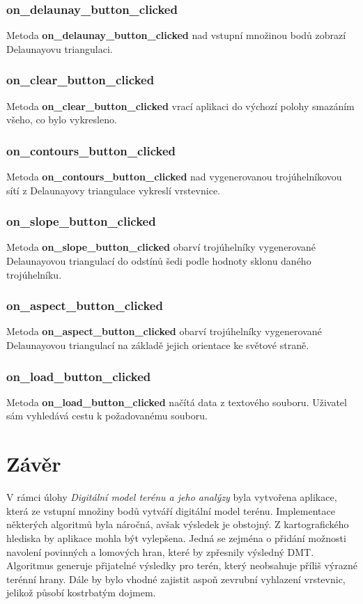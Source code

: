 \documentclass[a4paper, 12pt]{article}
\begin{document}
\subsubsection*{on\_delaunay\_button\_clicked}
Metoda \textbf{on\_delaunay\_button\_clicked} nad vstupní množinou bodů zobrazí Delaunayovu triangulaci. 

\subsubsection*{on\_clear\_button\_clicked}
Metoda \textbf{on\_clear\_button\_clicked} vrací aplikaci do výchozí polohy smazáním všeho, co bylo vykresleno. 

\subsubsection*{on\_contours\_button\_clicked}
Metoda \textbf{on\_contours\_button\_clicked} nad vygenerovanou trojúhelníkovou sítí z Delaunayovy triangulace vykreslí vrstevnice. 

\subsubsection*{on\_slope\_button\_clicked}
Metoda \textbf{on\_slope\_button\_clicked} obarví trojúhelníky vygenerované Delaunayovou triangulací do odstínů šedi podle hodnoty sklonu daného trojúhelníku.

\subsubsection*{on\_aspect\_button\_clicked}
Metoda \textbf{on\_aspect\_button\_clicked} obarví trojúhelníky vygenerované Delaunayovou triangulací na základě jejich orientace ke světové straně.

\subsubsection*{on\_load\_button\_clicked}
Metoda \textbf{on\_load\_button\_clicked} načítá data z textového souboru. Uživatel sám vyhledává cestu k požadovanému souboru.

\clearpage
\section{Závěr}
V rámci úlohy \textit{Digitální model terénu a jeho analýzy} byla vytvořena aplikace, která ze vstupní množiny bodů vytváří digitální model terénu. Implementace některých algoritmů byla náročná, avšak výsledek je obstojný. Z kartografického hlediska by aplikace mohla být  vylepšena. Jedná se zejména o přidání možnosti navolení povinných a lomových hran, které by zpřesnily výsledný DMT. Algoritmus generuje přijatelné výsledky pro terén, který neobsahuje příliš výrazné terénní hrany. Dále by bylo vhodné zajistit aspoň zevrubní vyhlazení vrstevnic, jelikož působí kostrbatým dojmem. \\
\end{document}
